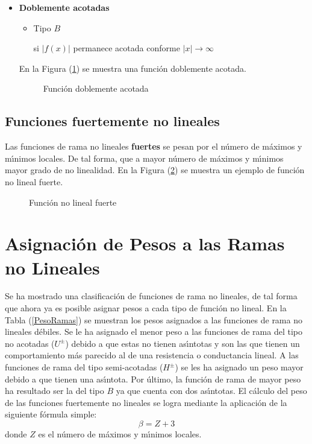 \documentclass[conference,letterpaper,onecolumn]{IEEEtran}
\begin{document}
\begin{itemize}
\item {\bf Doblemente acotadas}\hfill\par
      \begin{itemize}
      \item Tipo $B$\hfill\par
        si $|f(x)|$ permanece acotada
        conforme $|x|\to \infty$
      \end{itemize}
      En la Figura (\ref{BB}) se muestra una funci\'on doblemente acotada.
      \begin{figure}[!h]
       \centerline{
       \epsfxsize=60mm
       }
       \caption{Funci\'on doblemente acotada}
       \label{BB}
      \end{figure}
\end{itemize}

\subsection{Funciones fuertemente no lineales}
Las funciones de rama no lineales {\bf fuertes} se pesan por el
n\'umero de m\'aximos y m\'{\i}nimos locales. De tal forma, que
a mayor n\'umero de m\'aximos y m\'{\i}nimos mayor grado de no linealidad.
En la Figura (\ref{nl}) se muestra un ejemplo de funci\'on no lineal fuerte.
\begin{figure}[!h]
\centerline{
\epsfxsize=60mm
}
\caption{Funci\'on no lineal fuerte}
\label{nl}
\end{figure}

\section{Asignaci\'on de Pesos a las Ramas no Lineales}


Se ha mostrado una clasificaci\'on de funciones de rama no lineales,
de tal forma que ahora ya es posible asignar pesos a cada tipo de
funci\'on no lineal. En la Tabla (\ref{PesoRamas}) se muestran los pesos asignados a las
funciones de rama no lineales d\'ebiles. Se le ha asignado el menor peso a las funciones de rama
del tipo no acotadas ($U^{\pm}$) debido a que estas no tienen
as\'{\i}ntotas y son las que tienen un comportamiento m\'as parecido al
de una  resistencia o conductancia lineal.
A las funciones de rama del tipo semi-acotadas ($H^{\pm}$) se les ha
asignado un peso mayor debido a que tienen una as\'{\i}ntota.
Por \'ultimo, la funci\'on de rama de mayor peso ha resultado ser la
del tipo $B$ ya que cuenta con dos as\'{\i}ntotas.  El c\'alculo del peso de las funciones fuertemente no lineales se logra
mediante la aplicaci\'on de la siguiente f\'ormula simple:
\begin{displaymath}
\beta=Z+3
\end{displaymath}
donde $Z$ es el n\'umero de m\'aximos y m\'{\i}nimos locales.
\end{document}
